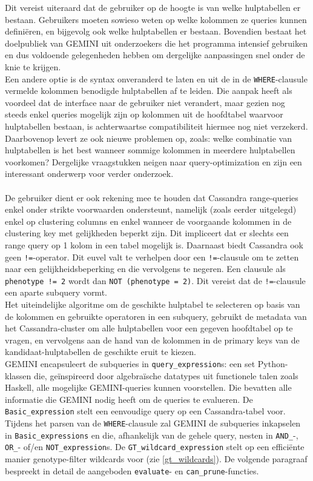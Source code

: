 Dit vereist uiteraard dat de gebruiker op de hoogte is van welke hulptabellen er bestaan. Gebruikers moeten sowieso weten op welke kolommen ze queries kunnen defini\"eren, en bijgevolg ook welke hulptabellen er bestaan. Bovendien bestaat het doelpubliek van GEMINI uit onderzoekers die het programma intensief gebruiken en dus voldoende gelegenheden hebben om dergelijke aanpassingen snel onder de knie te krijgen.\\
Een andere optie is de syntax onveranderd te laten en uit de in de \texttt{WHERE}-clausule vermelde kolommen benodigde hulptabellen af te leiden. Die aanpak heeft als voordeel dat de interface naar de gebruiker niet verandert, maar gezien nog steeds enkel queries mogelijk zijn op kolommen uit de hoofdtabel waarvoor hulptabellen bestaan, is achterwaartse compatibiliteit hiermee nog niet verzekerd. Daarbovenop levert ze ook nieuwe problemen op, zoals: welke combinatie van hulptabellen is het best wanneer sommige kolommen in meerdere hulptabellen voorkomen? Dergelijke vraagstukken neigen naar query-optimization en zijn een interessant onderwerp voor verder onderzoek.\\\\
De gebruiker dient er ook rekening mee te houden dat Cassandra range-queries enkel onder strikte voorwaarden ondersteunt, namelijk (zoals eerder uitgelegd) enkel op clustering columns en enkel wanneer de voorgaande kolommen in de clustering key met gelijkheden beperkt zijn. Dit impliceert dat er slechts een range query op 1 kolom in een tabel mogelijk is. Daarnaast biedt Cassandra ook geen \texttt{!=}-operator. Dit euvel valt te verhelpen door een \texttt{!=}-clausule om te zetten naar een gelijkheidsbeperking en die vervolgens te negeren. Een clausule als \texttt{phenotype != 2} wordt dan \texttt{NOT (phenotype = 2)}. Dit vereist dat de \texttt{!=}-clausule een aparte subquery vormt.\\

Het uiteindelijke algoritme om de geschikte hulptabel te selecteren op basis van de kolommen en gebruikte operatoren in een subquery, gebruikt de metadata van het Cassandra-cluster om alle hulptabellen voor een gegeven hoofdtabel op te vragen, en vervolgens aan de hand van de kolommen in de primary keys van de kandidaat-hulptabellen de geschikte eruit te kiezen.\\

GEMINI encapsuleert de subqueries in \texttt{query\_expression}s: een set Python-klassen die, ge\"inspireerd door algebra\"ische datatypes uit functionele talen zoals Haskell, alle mogelijke GEMINI-queries kunnen voorstellen. Die bevatten alle informatie die GEMINI nodig heeft om de queries te evalueren. De \texttt{Basic\_expression} stelt een eenvoudige query op een Cassandra-tabel voor. Tijdens het parsen van de \texttt{WHERE}-clausule zal GEMINI de subqueries inkapselen in \texttt{Basic\_expressions} en die, afhankelijk van de gehele query, nesten in \texttt{AND\_}-, \texttt{OR\_}- of/en \texttt{NOT\_expression}s. De \texttt{GT\_wildcard\_expression} stelt op een effici\"ente manier genotype-filter wildcards voor (zie \ref{gt_wildcards}). De volgende paragraaf bespreekt in detail de aangeboden \texttt{evaluate}- en \texttt{can\_prune}-functies.


